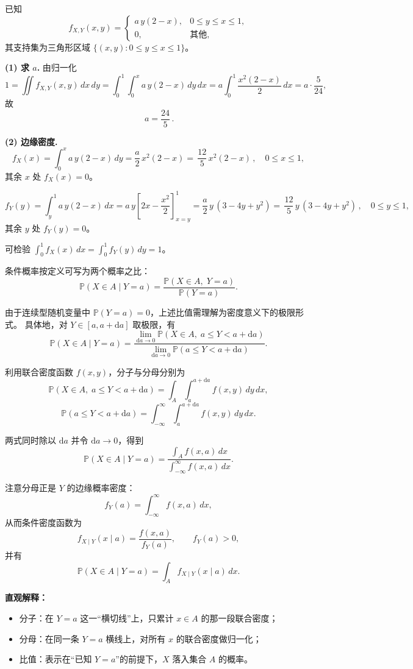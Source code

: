 \begin{solution}
已知
\[
f_{X,Y}(x,y)=
\begin{cases}
a\,y(2-x),& 0\le y\le x\le 1,\\
0,& \text{其他},
\end{cases}
\]
其支持集为三角形区域 $\{(x,y):0\le y\le x\le 1\}$。

\textbf{(1) 求 $a$.} 由归一化
\[
1=\iint f_{X,Y}(x,y)\,dx\,dy
=\int_{0}^{1}\!\!\int_{0}^{x} a\,y(2-x)\,dy\,dx
= a\int_{0}^{1}\frac{x^2(2-x)}{2}\,dx
= a\cdot\frac{5}{24},
\]
故
\[
\boxed{\,a=\dfrac{24}{5}\, }.
\]

\textbf{(2) 边缘密度.}
\[
f_X(x)=\int_{0}^{x} a\,y(2-x)\,dy
=\frac{a}{2}\,x^2(2-x)
=\boxed{\,\frac{12}{5}\,x^2(2-x)\,},\quad 0\le x\le 1,
\]
其余 $x$ 处 $f_X(x)=0$。

\[
f_Y(y)=\int_{y}^{1} a\,y(2-x)\,dx
=a\,y\!\left[2x-\frac{x^2}{2}\right]_{x=y}^{1}
=\frac{a}{2}\,y\,(3-4y+y^2)
=\boxed{\,\frac{12}{5}\,y\,(3-4y+y^2)\,},\quad 0\le y\le 1,
\]
其余 $y$ 处 $f_Y(y)=0$。

\smallskip
可检验 $\int_0^1 f_X(x)\,dx=\int_0^1 f_Y(y)\,dy=1$。
\end{solution}
\begin{dxtips}

\noindent
条件概率按定义可写为两个概率之比：
\[
\mathbb P(X\in A\mid Y=a)
=
\frac{\mathbb P(X\in A,\; Y=a)}{\mathbb P(Y=a)}.
\]

\noindent
由于连续型随机变量中 $\mathbb P(Y=a)=0$，上述比值需理解为密度意义下的极限形式。
具体地，对 $Y\in[a,a+\mathrm da]$ 取极限，有
\[
\mathbb P(X\in A\mid Y=a)
=
\frac{\displaystyle
\lim_{\mathrm da\to 0}\mathbb P(X\in A,\; a\le Y<a+\mathrm da)
}
{\displaystyle
\lim_{\mathrm da\to 0}\mathbb P(a\le Y<a+\mathrm da)
}.
\]

\noindent
利用联合密度函数 $f(x,y)$，分子与分母分别为
\[
\mathbb P(X\in A,\; a\le Y<a+\mathrm da)
=
\int_A\int_a^{a+\mathrm da} f(x,y)\,dy\,dx,
\]
\[
\mathbb P(a\le Y<a+\mathrm da)
=
\int_{-\infty}^{\infty}\int_a^{a+\mathrm da} f(x,y)\,dy\,dx.
\]

\noindent
两式同时除以 $\mathrm da$ 并令 $\mathrm da\to 0$，得到
\[
\mathbb P(X\in A\mid Y=a)
=
\frac{\displaystyle\int_A f(x,a)\,dx}
{\displaystyle\int_{-\infty}^{\infty} f(x,a)\,dx}.
\]

\noindent
注意分母正是 $Y$ 的边缘概率密度：
\[
f_Y(a)=\int_{-\infty}^{\infty} f(x,a)\,dx,
\]
从而条件密度函数为
\[
f_{X\mid Y}(x\mid a)=\frac{f(x,a)}{f_Y(a)},\qquad f_Y(a)>0,
\]
并有
\[
\mathbb P(X\in A\mid Y=a)
=
\int_A f_{X\mid Y}(x\mid a)\,dx.
\]

\noindent
\textbf{直观解释：}
\begin{itemize}
  \item 分子：在 $Y=a$ 这一“横切线”上，只累计 $x\in A$ 的那一段联合密度；
  \item 分母：在同一条 $Y=a$ 横线上，对所有 $x$ 的联合密度做归一化；
  \item 比值：表示在“已知 $Y=a$”的前提下，$X$ 落入集合 $A$ 的概率。
\end{itemize}

\end{dxtips}
